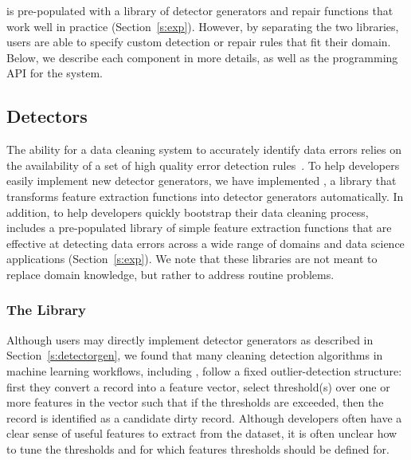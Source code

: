 \sys is pre-populated with a library of detector generators and repair functions that work well in practice (Section~\ref{s:exp}).  However, by separating the two libraries, users are able to specify custom detection or repair rules that fit their domain.  Below, we describe each component in more details, as well as the programming API for the system.

\subsection{Detectors}

The ability for a data cleaning system to accurately identify data errors relies on the availability of a set of high quality error detection rules~\cite{DBLP:conf/sigmod/ChuIKW16}.  To help developers easily implement new detector generators, we have implemented \detectlib, a library that transforms feature extraction functions into detector generators automatically.  In addition, to help developers quickly bootstrap their data cleaning process, \sys includes a pre-populated library of simple feature extraction functions that are effective at detecting data errors across a wide range of domains and data science applications (Section~\ref{s:exp}).  We note that these libraries are not meant to replace domain knowledge, but rather to address routine problems.


\subsubsection{The \detectlib Library}
Although users may directly implement detector generators as described in Section~\ref{s:detectorgen}, we found that many cleaning detection algorithms in machine learning workflows, including \company, follow a fixed outlier-detection structure: first they convert a record into a feature vector,  select threshold(s) over one or more features in the vector such that if the thresholds are exceeded, then the record is identified as a candidate dirty record.  Although developers often have a clear sense of useful features to extract from the dataset, it is often unclear how to tune the thresholds and for which features thresholds should be defined for.  

